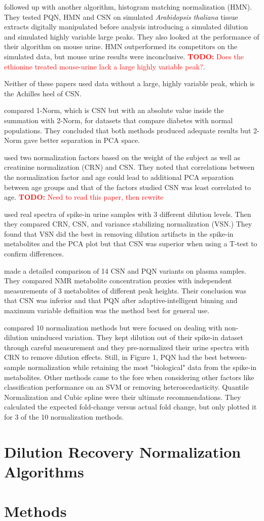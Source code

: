 \documentclass[english]{article}
\newcommand{\todo}[1]{\textcolor{red}{\textbf{TODO:} #1}}
\begin{document}
\citep{Torgrip2008} followed up with another algorithm, histogram matching normalization (HMN). They tested PQN, HMN and CSN on simulated \textit{Arabidopsis thaliana} tissue extracts digitally manipulated before analysis introducing a simulated dilution and simulated highly variable large peaks. They also looked at the performance of their algorithm on mouse urine. HMN outperformed its competitors on the simulated data, but mouse urine results were inconclusive. \todo{Does the ethionine treated mouse-urine lack a large highly variable peak?}.

Neither of these papers used data without a large, highly variable peak, which is the Achilles heel of CSN.

\citep{Wen2007} compared 1-Norm, which is CSN but with an absolute value inside the summation with 2-Norm, for datasets that compare diabetes with normal populations. They concluded that both methods produced adequate results but 2-Norm gave better separation in PCA space.

\citep{Schnackenberg2007} used two normalization factors based on the weight of the subject as well as creatinine normalization (CRN) and CSN. They noted that correlations between the normalization factor and age could lead to additional PCA separation between age groups and that of the factors studied CSN was least correlated to age. \todo{Need to read this paper, then rewrite}

\citep{Zhang2009a} used real spectra of spike-in urine samples with 3 different dilution levels. Then they compared CRN, CSN, and variance stabilizing normalization (VSN.) They found that VSN did the best in removing dilution artifacts in the spike-in metabolites and the PCA plot but that CSN was superior when using a T-test to confirm differences.

\citep{DeMeyer2010a} made a detailed comparison of 14 CSN and PQN variants on plasma samples. They compared NMR metabolite concentration proxies with independent measurements of 3 metabolites of different peak heights. Their conclusion was that CSN was inferior and that PQN after adaptive-intelligent binning and maximum variable definition was the method best for general use.

\citep{Kohl2012} compared 10 normalization methods but were focused on dealing with non-dilution uninduced variation. They kept dilution out of their spike-in dataset through careful measurement and they pre-normalized their urine spectra with CRN to remove dilution effects. Still, in Figure 1, PQN had the best between-sample normalization while retaining the most "biological" data from the spike-in metabolites. Other methods came to the fore when considering other factors like classification performance on an SVM or removing heteroscedasticity. Quantile Normalization and Cubic spline were their ultimate recommendations. They calculated the expected fold-change versus actual fold change, but only plotted it for 3 of the 10 normalization methods.

\section{Dilution Recovery Normalization Algorithms}
\section{Methods}



\end{document}
